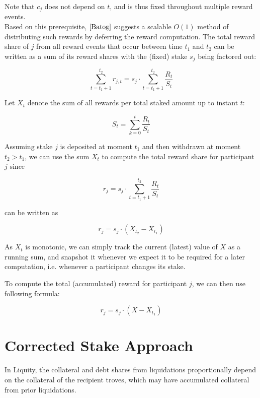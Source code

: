 \documentclass[reqno]{article}
\begin{document}
Note that $c_j$ does not depend on $t$, and is thus fixed throughout multiple reward events.  \\

Based on this prerequisite, $\cite{Batog}$ suggests a scalable $O(1)$ method of distributing such rewards by deferring the reward computation. The total reward share of $j$ from all reward events that occur between time $t_1$ and $t_2$ can be written as a sum of its reward shares with the (fixed) stake $s_j$ being factored out:

\begin{equation}
    \sum\limits_{t=t_1+1}^{t_2} r_{j,t} = s_j \cdot \sum\limits_{t=t_1+1}^{t_2}\frac{R_t}{S_t}
\end{equation}

Let $X_t$ denote the sum of all rewards per total staked amount up to instant $t$:

\begin{equation}
   S_t = \sum\limits_{k=0}^{t}\frac{R_t}{S_t}
\end{equation}

Assuming stake $j$ is deposited at moment $t_1$ and then
withdrawn at moment $t_2 > t_1$, we can use the sum $X_t$ to
compute the total reward share for participant $j$ since


\begin{equation} 
    r_j = s_j \cdot \sum\limits_{t=t_1+1}^{t_2}\frac{R_t}{S_t}
\end{equation}

can be written as

\begin{equation} 
    r_j = s_j \cdot (X_{t_2} - X_{t_1})
\end{equation}

As $X_t$ is monotonic, we can simply track the current (latest)
value of $X$ as a running sum, and snapshot it whenever we expect it to be required for a later computation, i.e. whenever a participant changes its stake.

To compute the total (accumulated) reward for participant $j$, we can then use following formula:

\begin{equation} 
    r_j = s_j \cdot (X - X_{t_1})
\end{equation}

\bigskip

\section{Corrected Stake Approach}
In Liquity, the collateral and debt shares from liquidations proportionally depend on the collateral of the recipient troves, which may have accumulated collateral from prior liquidations. 
\end{document}
